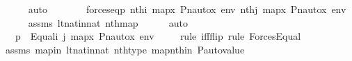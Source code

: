 \begin{isabellebody}
\ \ \ \ \isamarkupfalse%
\ auto\isanewline
\ \ \isamarkupfalse%
\ \isamarkupfalse%
\ {\isachardoublequoteopen}{\isachardot}{\kern0pt}{\isachardot}{\kern0pt}{\isachardot}{\kern0pt}\ {\isasymlongleftrightarrow}\ forces{\isacharunderscore}{\kern0pt}eq{\isacharparenleft}{\kern0pt}{\isasympi}{\isacharbackquote}{\kern0pt}p{\isacharcomma}{\kern0pt}\ nth{\isacharparenleft}{\kern0pt}i{\isacharcomma}{\kern0pt}\ map{\isacharparenleft}{\kern0pt}{\isasymlambda}x{\isachardot}{\kern0pt}\ Pn{\isacharunderscore}{\kern0pt}auto{\isacharparenleft}{\kern0pt}{\isasympi}{\isacharparenright}{\kern0pt}{\isacharbackquote}{\kern0pt}x{\isacharcomma}{\kern0pt}\ env{\isacharparenright}{\kern0pt}{\isacharparenright}{\kern0pt}{\isacharcomma}{\kern0pt}\ nth{\isacharparenleft}{\kern0pt}j{\isacharcomma}{\kern0pt}\ map{\isacharparenleft}{\kern0pt}{\isasymlambda}x{\isachardot}{\kern0pt}\ Pn{\isacharunderscore}{\kern0pt}auto{\isacharparenleft}{\kern0pt}{\isasympi}{\isacharparenright}{\kern0pt}{\isacharbackquote}{\kern0pt}x{\isacharcomma}{\kern0pt}\ env{\isacharparenright}{\kern0pt}{\isacharparenright}{\kern0pt}{\isacharparenright}{\kern0pt}{\isachardoublequoteclose}\ \isanewline
\ \ \ \ \isamarkupfalse%
\ assms\ lt{\isacharunderscore}{\kern0pt}nat{\isacharunderscore}{\kern0pt}in{\isacharunderscore}{\kern0pt}nat\ nth{\isacharunderscore}{\kern0pt}map\isanewline
\ \ \ \ \isamarkupfalse%
\ auto\isanewline
\ \ \isamarkupfalse%
\ \isamarkupfalse%
\ {\isachardoublequoteopen}{\isachardot}{\kern0pt}{\isachardot}{\kern0pt}{\isachardot}{\kern0pt}\ {\isasymlongleftrightarrow}\ {\isasympi}{\isacharbackquote}{\kern0pt}p\ {\isasymtturnstile}\ Equal{\isacharparenleft}{\kern0pt}i{\isacharcomma}{\kern0pt}\ j{\isacharparenright}{\kern0pt}\ map{\isacharparenleft}{\kern0pt}{\isasymlambda}x{\isachardot}{\kern0pt}\ Pn{\isacharunderscore}{\kern0pt}auto{\isacharparenleft}{\kern0pt}{\isasympi}{\isacharparenright}{\kern0pt}{\isacharbackquote}{\kern0pt}x{\isacharcomma}{\kern0pt}\ env{\isacharparenright}{\kern0pt}{\isachardoublequoteclose}\isanewline
\ \ \ \ \isamarkupfalse%
{\isacharparenleft}{\kern0pt}rule\ iff{\isacharunderscore}{\kern0pt}flip{\isacharcomma}{\kern0pt}\ rule\ Forces{\isacharunderscore}{\kern0pt}Equal{\isacharparenright}{\kern0pt}\isanewline
\ \ \ \ \isamarkupfalse%
\ assms\ mapin\ lt{\isacharunderscore}{\kern0pt}nat{\isacharunderscore}{\kern0pt}in{\isacharunderscore}{\kern0pt}nat\ nth{\isacharunderscore}{\kern0pt}type\ mapnthin\ P{\isacharunderscore}{\kern0pt}auto{\isacharunderscore}{\kern0pt}value\isanewline

\end{isabellebody}
